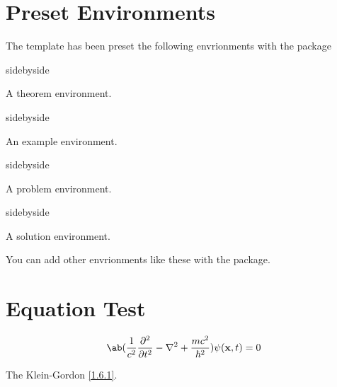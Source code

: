 \section{Preset Environments}
The template has been preset the following envrionments with the  package

\begin{tcblisting}{sidebyside}
    \begin{theorem}
        A theorem environment.
    \end{theorem}
\end{tcblisting}

\begin{tcblisting}{sidebyside}
    \begin{example}
        An example environment.
    \end{example}
\end{tcblisting}

\begin{tcblisting}{sidebyside}
    \begin{problem}
        A problem environment.
    \end{problem}
\end{tcblisting}

\begin{tcblisting}{sidebyside}
    \begin{solution}
        A solution environment.
    \end{solution}
\end{tcblisting}

You can add other envrionments like these with the  package.

\section{Equation Test}
\begin{equation}
    \ab(\frac1{c^2}\frac{\partial^2}{\partial t^2}-\nabla^2+\frac{mc^2}{\hbar^2})\psi(\mathbf x,t)=0
    \label{1.6.1}
\end{equation}

The Klein-Gordon \eqref{1.6.1}.

